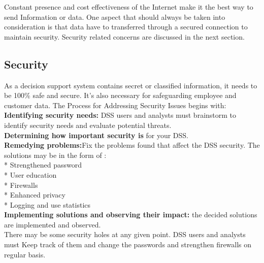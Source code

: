 Constant presence and cost effectiveness of the Internet make it the best way to send Information or data. One aspect that should always be taken into consideration is that data have to transferred through a secured connection to maintain security. Security related concerns are discussed in the next section.
\subsection{Security}
As a decision support system contains secret or classified information, it needs to be 100\% safe and secure. It’s also necessary for safeguarding employee and customer data.
The Process for Addressing Security Issues begins with:\\
\indent \textbf{Identifying security needs:} DSS users and analysts must brainstorm to identify security needs and evaluate potential threats.\\
\indent \textbf{Determining how important security is} for your DSS.\\
\indent \textbf{Remedying problems:}Fix the problems found that affect the DSS security. The solutions may be in the form of \cite{DSS}:\\
* Strengthened password\\
* User education\\
* Firewalls\\
* Enhanced privacy\\
* Logging and use statistics\\
\indent \textbf{Implementing solutions and observing their impact:} the decided solutions are implemented and observed.\\ 
There may be some security holes at any given point. DSS users and analysts must Keep track of them and change the passwords and strengthen firewalls on regular basis.
